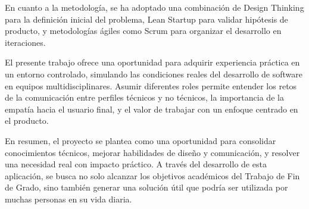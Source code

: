 En cuanto a la metodología, se ha adoptado una combinación de Design Thinking para la definición inicial del problema, Lean Startup para validar hipótesis de producto, y metodologías ágiles como Scrum para organizar el desarrollo en iteraciones.

El presente trabajo ofrece una oportunidad para adquirir experiencia práctica en un entorno controlado, simulando las condiciones reales del desarrollo de software en equipos multidisciplinares. Asumir diferentes roles permite entender los retos de la comunicación entre perfiles técnicos y no técnicos, la importancia de la empatía hacia el usuario final, y el valor de trabajar con un enfoque centrado en el producto.

En resumen, el proyecto se plantea como una oportunidad para consolidar conocimientos técnicos, mejorar habilidades de diseño y comunicación, y resolver una necesidad real con impacto práctico. A través del desarrollo de esta aplicación, se busca no solo alcanzar los objetivos académicos del Trabajo de Fin de Grado, sino también generar una solución útil que podría ser utilizada por muchas personas en su vida diaria.
